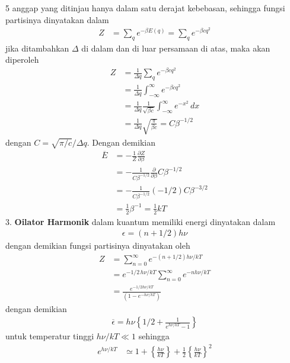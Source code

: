 \documentclass[a4paper  , 6 pt]{article}
\begin{document}
\begin{tiny}
\begin{multicols} {5}
anggap yang ditinjau hanya dalam satu derajat kebebasan, sehingga fungsi partisinya dinyatakan dalam
\begin{align}
Z & = \sum_q e^{- \beta E(q)} = \sum_q e^{-\beta cq^2}
\end{align}
jika ditambahkan $\Delta$ di dalam dan di luar persamaan di atas, maka akan diperoleh
\begin{align}
Z& = \frac{1}{\Delta q} \sum_q e^{-\beta c q^2} \nonumber \\
& = \frac{1}{\Delta q} \int_{-\infty}^{\infty} e^{-\beta c q^2} \nonumber \\
& = \frac{1}{\Delta q} \frac{1}{\sqrt{\beta c}} \int_{-\infty }^{\infty} e^{- x^2} \, dx  \nonumber \\
& = \frac{1}{\Delta q} \sqrt{\frac{\pi}{\beta c}}  = C \beta^{-1/2} 
\end{align}
dengan $C = \sqrt{\pi / c } / \Delta q$. Dengan demikian 
\begin{align}
\overline{ E} &= -  \frac{1}{Z} \frac{\partial Z}{\partial \beta } \nonumber \\
& = - \frac{1}{C \beta ^{- 1/2}} \frac{\partial }{\partial \beta } C \beta^{-1/2} \nonumber \\
& = - \frac{1}{C \beta^{-1/2} } (- 1/2) C \beta^{- 3/2} \nonumber \\
& = \frac{1}{2} \beta^{-1}  = \frac{1}{2} kT
\end{align}
3. \textbf{Oilator Harmonik} dalam kuantum memiliki energi dinyatakan dalam 
\begin{align}
\epsilon = (n + 1/2) h \nu 
\end{align}
dengan demikian fungsi partisinya dinyatakan oleh
\begin{align}
Z & = \sum_{n = 0}^{\infty} e^{- (n+ 1/2)h \nu / kT} \nonumber \\
& = e^{- 1/2 \, h \nu / kT} \sum_{n = 0}^{\infty} e^{- n h \nu / kT} \nonumber \\
& = \frac{e^{- 1/2 h \nu /k T}}{(1 - e^{- h\nu /kT})}
\end{align}
dengan demikian 
\begin{align}
\overline{\epsilon} = h \nu \left \lbrace  1/2  + \frac{1}{e^{h\nu /kT} - 1}\right \rbrace 
\end{align}
untuk temperatur tinggi $h\nu /kT \ll 1$ sehingga 
\begin{align}
e^{h\nu /kT} &\simeq 1 + \left \lbrace \frac{h\nu}{kT} \right \rbrace + \frac{1}{2} \left \lbrace \frac{h\nu}{kT} \right \rbrace^{2} 
\end{align}

\end{multicols}
\end{tiny}
\end{document}
